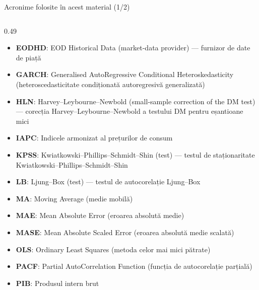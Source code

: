 \begin{frame}{Acronime folosite în acest material (1/2)}
\begin{columns}[T]
\begin{column}{0.49\textwidth}
\begin{itemize}
    \item \textbf{EODHD}: EOD Historical Data (market-data provider) — furnizor de date de piață
    \item \textbf{GARCH}: Generalised AutoRegressive Conditional Heteroskedasticity (heteroscedasticitate condiționată autoregresivă generalizată)
    \item \textbf{HLN}: Harvey–Leybourne–Newbold (small-sample correction of the DM test) — corecția Harvey–Leybourne–Newbold a testului DM pentru eșantioane mici
    \item \textbf{IAPC}: Indicele armonizat al prețurilor de consum
    \item \textbf{KPSS}: Kwiatkowski–Phillips–Schmidt–Shin (test) — testul de staționaritate Kwiatkowski–Phillips–Schmidt–Shin
    \item \textbf{LB}: Ljung–Box (test) — testul de autocorelație Ljung–Box
    \item \textbf{MA}: Moving Average (medie mobilă)
    \item \textbf{MAE}: Mean Absolute Error (eroarea absolută medie)
    \item \textbf{MASE}: Mean Absolute Scaled Error (eroarea absolută medie scalată)
    \item \textbf{OLS}: Ordinary Least Squares (metoda celor mai mici pătrate)
    \item \textbf{PACF}: Partial AutoCorrelation Function (funcția de autocorelație parțială)
    \item \textbf{PIB}: Produsul intern brut
\end{itemize}
\end{column}
\end{columns}
\end{frame}
